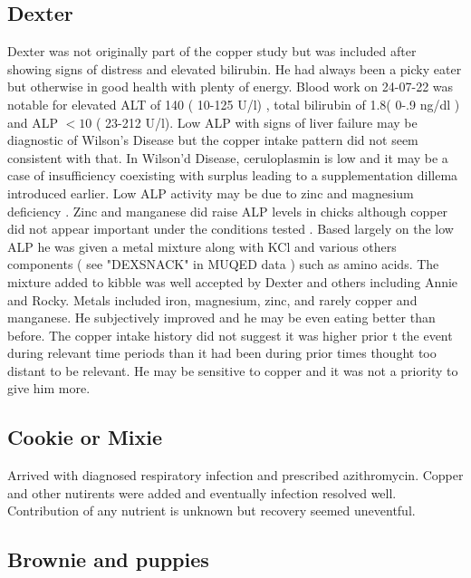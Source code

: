 \mjmcasetab

\subsection{Dexter}

\mjmdextercu

Dexter was not originally part of the copper study  but was included after
showing signs of distress and elevated bilirubin.  
He had always been a picky eater but otherwise in good
health with plenty of energy. 
Blood work on 24-07-22
was notable for elevated ALT of 140 ( 10-125 U/l) , total bilirubin
of 1.8( 0-.9 ng/dl ) and ALP $<10$ ( 23-212 U/l). 
Low ALP with signs of liver failure may be diagnostic of
Wilson's Disease but the copper intake pattern did not seem
consistent with that. In Wilson'd Disease, ceruloplasmin is low
\cite{PMC9768184}
and it may be a case of insufficiency coexisting with surplus
leading to a supplementation dillema introduced earlier.
Low ALP activity may be due to  zinc and magnesium  deficiency
\cite{Ray_Singh_Jena_Alkaline_Phosphatase_}.
Zinc and manganese did raise ALP levels in chicks
although copper did not appear important under the conditions tested
\cite{Santos_Gonccalves_Neira_Effects_Supplementation_2023}.
Based largely on the low ALP he was given a metal mixture along
with KCl and various others components ( see "DEXSNACK" in MUQED data )
 such as amino acids.
The mixture added to kibble was well accepted by Dexter and 
others including Annie and Rocky. Metals included iron, magnesium,
zinc, and rarely copper and manganese. He subjectively improved
and he may be even eating better than before. 
The copper intake history did not suggest it was higher
prior t the event during relevant time periods  than it had 
been during prior times thought too distant to be relevant. 
He may be sensitive to copper and it was not a priority to
give him more. 

\subsection{Cookie or Mixie}

\mjmmixiecu

Arrived with diagnosed respiratory infection and prescribed azithromycin.
Copper and other nutirents were added and eventually infection
resolved well. Contribution of any nutrient is unknown but recovery
seemed uneventful.

\subsection{Brownie and puppies}

